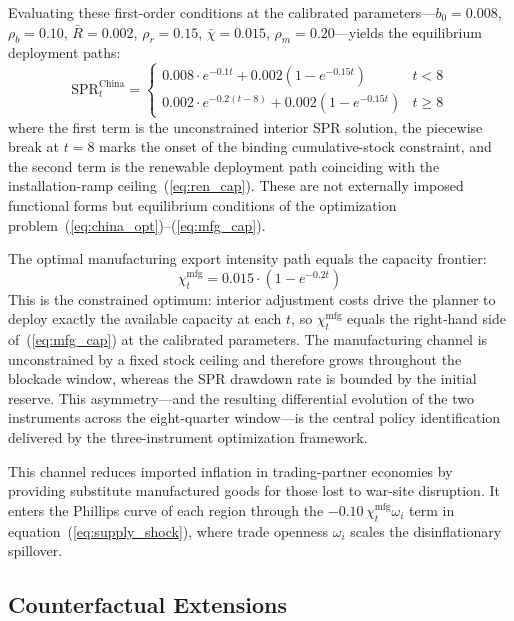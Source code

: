 \documentclass[12pt]{article}
\begin{document}
Evaluating these first-order conditions at the calibrated parameters---$b_0 = 0.008$, $\rho_b = 0.10$, $\bar{R} = 0.002$, $\rho_r = 0.15$, $\bar{\chi} = 0.015$, $\rho_m = 0.20$---yields the equilibrium deployment paths:
\begin{equation}
\text{SPR}^{\text{China}}_t = \begin{cases} 0.008 \cdot e^{-0.1t} + 0.002(1-e^{-0.15t}) & t < 8 \\ 0.002 \cdot e^{-0.2(t-8)} + 0.002(1-e^{-0.15t}) & t \geq 8 \end{cases}
\label{eq:spr}
\end{equation}
where the first term is the unconstrained interior SPR solution, the piecewise break at $t=8$ marks the onset of the binding cumulative-stock constraint, and the second term is the renewable deployment path coinciding with the installation-ramp ceiling~(\ref{eq:ren_cap}). These are not externally imposed functional forms but equilibrium conditions of the optimization problem~(\ref{eq:china_opt})--(\ref{eq:mfg_cap}).

The optimal manufacturing export intensity path equals the capacity frontier:
\begin{equation}
\chi^{\text{mfg}}_t = 0.015 \cdot (1 - e^{-0.2t})
\label{eq:mfg}
\end{equation}
This is the constrained optimum: interior adjustment costs drive the planner to deploy exactly the available capacity at each $t$, so $\chi^{\text{mfg}}_t$ equals the right-hand side of~(\ref{eq:mfg_cap}) at the calibrated parameters. The manufacturing channel is unconstrained by a fixed stock ceiling and therefore grows throughout the blockade window, whereas the SPR drawdown rate is bounded by the initial reserve. This asymmetry---and the resulting differential evolution of the two instruments across the eight-quarter window---is the central policy identification delivered by the three-instrument optimization framework.

This channel reduces imported inflation in trading-partner economies by providing substitute manufactured goods for those lost to war-site disruption. It enters the Phillips curve of each region through the $-0.10\,\chi^{\text{mfg}}_t\omega_i$ term in equation~(\ref{eq:supply_shock}), where trade openness $\omega_i$ scales the disinflationary spillover.

\subsection{Counterfactual Extensions}
\end{document}
